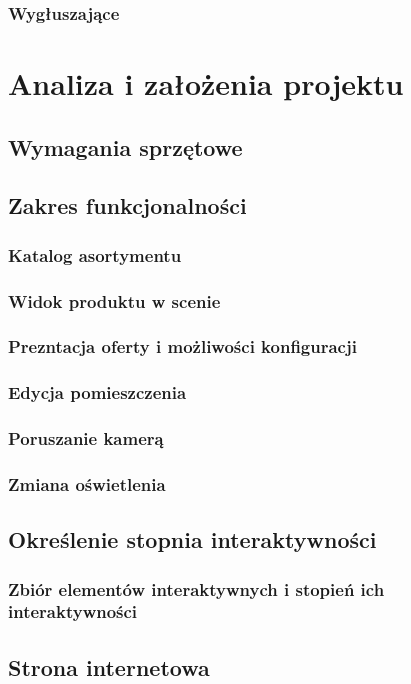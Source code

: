 \documentclass{article} %
\begin{document}
        \subsubsection{Wygłuszające}
\section{Analiza i założenia projektu}
    \subsection{Wymagania sprzętowe}
    \subsection{Zakres funkcjonalności}
        \subsubsection{Katalog asortymentu}
        \subsubsection{Widok produktu w scenie}
        \subsubsection{Prezntacja oferty i możliwości konfiguracji}
        \subsubsection{Edycja pomieszczenia}
        \subsubsection{Poruszanie kamerą}
        \subsubsection{Zmiana oświetlenia}
    \subsection{Określenie stopnia interaktywności}
        \subsubsection{Zbiór elementów interaktywnych i stopień ich interaktywności}
    \subsection{Strona internetowa}
\end{document}
